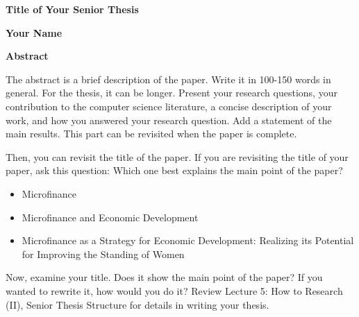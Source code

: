 \thispagestyle{plain}
\begin{center}
    \Large
    \textbf{Title of Your Senior Thesis}
    
    \vspace{0.4cm}
    \large
    
    \vspace{0.4cm}
    \textbf{Your Name}
    
    \vspace{0.9cm}
    \textbf{Abstract}
\end{center}


The abstract is a brief description of the paper. Write it in 100-150 words in general. For the thesis, it can be longer. Present your research questions, your contribution to the computer science literature, a concise description of your work, and how you answered your research question. Add a statement of the main results. 
This part can be revisited when the paper is complete. 

\hfill

Then, you can revisit the title of the paper. If you are revisiting the title of your paper, ask this question: Which one best explains the main point of the paper? 

\begin{itemize}
    \item Microfinance
    \item Microfinance and Economic Development
    \item Microfinance as a Strategy for Economic Development: Realizing its Potential for Improving the Standing of Women
\end{itemize}

Now, examine your title. Does it show the main point of the paper? If you wanted to rewrite it, how would you do it? 
Review Lecture 5: How to Research (II), Senior Thesis Structure for details in writing your thesis.  



